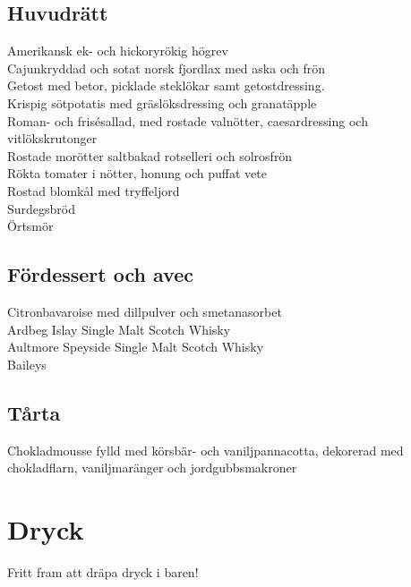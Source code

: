 \documentclass[a5paper]{article}
\begin{document}
	\subsection*{Huvudrätt}
	\begin{spacing}{1.3}
		Amerikansk ek- och hickoryrökig högrev \\  
		Cajunkryddad och sotat norsk fjordlax med aska och frön   \\
		Getost med betor, picklade steklökar samt getostdressing. \\
		Krispig sötpotatis med gräslöksdressing och granatäpple   \\
		Roman- och frisésallad, med rostade valnötter, caesardressing och vitlökskrutonger \\
		Rostade morötter saltbakad rotselleri och solrosfrön      \\
		Rökta tomater i nötter, honung och puffat vete \\
		Rostad blomkål med tryffeljord  \\
		Surdegsbröd \\
		Örtsmör
	\end{spacing}	
	
	\vspace{-0.1cm}
	\subsection*{Fördessert och avec}
	\begin{spacing}{1.3}
		Citronbavaroise med dillpulver och smetanasorbet \\ 
		Ardbeg Islay Single Malt Scotch Whisky \\ 
		Aultmore Speyside Single Malt Scotch Whisky \\
		Baileys
	\end{spacing}
	\vspace{-0.1cm}
	
	\subsection*{Tårta}
	\begin{spacing}{1.3}
		Chokladmousse fylld med körsbär- och vaniljpannacotta, dekorerad med chokladflarn, vaniljmaränger och jordgubbsmakroner
	\end{spacing}

	
	\newpage
	\section{Dryck}
	Fritt fram att dräpa dryck i baren!
		
\end{document}
